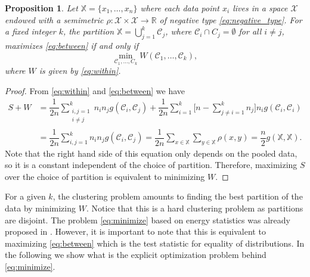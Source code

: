 \documentclass[aps,preprint,nofootinbib,floatfix]{revtex4-1}
\newtheorem{proposition}[theorem]{Proposition}
\newcommand\C{{\mathcal{C}}}
\begin{document}
\begin{proposition}
\label{th:minimize}
Let $\mathbb{X} = \{x_1,\dotsc,x_n\}$ where each data point
$x_i$ lives in a space $\mathcal{X}$ endowed with a semimetric $\rho:
\mathcal{X}\times\mathcal{X} \to \mathbb{R}$ of
negative type \eqref{eq:negative_type}. For a fixed integer $k$,
the partition
$\mathbb{X} = \bigcup_{j=1}^k \C_j$, where $\C_i \cap C_j = \emptyset$ for
all $i\ne j$, maximizes \eqref{eq:between} if and only if
\begin{equation}
\label{eq:minimize}
\min_{\C_1,\dotsc,C_k  } W(
\C_1, \dotsc, \C_k),
\end{equation}
where $W$ is given by \eqref{eq:within}.
\end{proposition}
\begin{proof}
From \eqref{eq:within} and \eqref{eq:between}
we have
\begin{equation}
\begin{split}
S + W &= 
\dfrac{1}{2n} \sum_{\substack{i,j=1 \\ i\ne j}}^k n_i n_j g(\C_i, \C_j)
+ \dfrac{1}{2n} \sum_{i=1}^{k} 
\bigg[ n - 
\sum_{j\ne i = 1}^k n_j \bigg] 
n_i g(\C_i, \C_i) 
\\
& = \dfrac{1}{2n} \sum_{i,j=1}^k n_i n_j g(\C_i, \C_j)
= \dfrac{1}{2n} \sum_{x \in \mathbb{X}} \sum_{y \in \mathbb{X}} \rho(x,y)
= \dfrac{n}{2} g(\mathbb{X}, \mathbb{X}).
\end{split}
\end{equation}
Note that the right hand side of this equation 
only depends on the pooled data, so it is a constant
independent of the choice of partition. Therefore, maximizing
$S$ over the choice of partition is equivalent to minimizing $W$.
\end{proof}

For a given $k$, the clustering problem amounts to
finding the best partition of the data by minimizing $W$.
Notice that this is a hard clustering problem as partitions
are disjoint. The problem \eqref{eq:minimize} based on
energy statistics was already proposed in \cite{Kgroups}. However, it is
important to note that this is equivalent to maximizing \eqref{eq:between}
which is the test statistic for equality of distributions. In the following
we show what is the explicit optimization problem behind \eqref{eq:minimize}.
\end{document}

